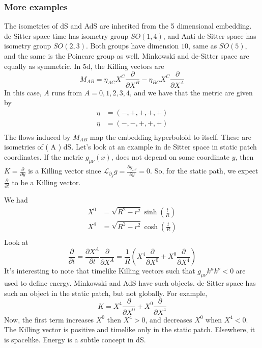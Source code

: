 \subsubsection{More examples} 
The isometries of dS and AdS are inherited from 
the 5 dimensional embedding. 
de-Sitter space time has isometry group $ SO ( 1, 4 ) $, 
and Anti de-Sitter space has isometry group $ SO ( 2, 3 ) $. 
Both groups have dimension  $ 10 $, same as 
$ SO ( 5 ) $, and the same is the Poincare group as well.
Minkowski and de-Sitter space are equally as symmetric.
In 5d, the Killing vectors are 
\[
 M_{ AB }  = \eta_{ AC } X ^ C \frac{\partial  }{\partial  X ^ B } - 
 \eta _{ B C} X ^ C \frac{\partial   }{\partial  X ^ A } 
\] In this case, $ A $ runs from $ A  = 0 , 1, 2, 3, 4$, 
and we have that the metric are given by 
 \begin{align*}
	 \eta &=  ( - , + , + , + , + )  \\
	 \eta &=  (- , -, + , + , + )  \\
 \end{align*} 
 The flows induced by $ M_{AB } $ map the embedding 
 hyperboloid to itself. These are isometries of 
 ( A ) dS. 
 Let's look at an example in de Sitter space in static patch coordinates. 
 If the metric $ g_{ \mu \nu } ( x) $, does not 
 depend on some coordinate $ y $, then $ K = \frac{\partial }{\partial y } $ 
 is a Killing vector since $ \mathcal{ L }_{ \partial  _ y } g   = 
 \frac{ \partial  g_{ \mu \nu } }{ \partial  y }  = 0 $. 
 So, for the static path, we expect $ \frac{\partial  }{\partial  t }  $ 
 to be a Killing vector.

 We had 
 \begin{align*}
	 X ^ 0 &=  \sqrt{ R ^ 2 - r ^ 2 }  \sinh \left(  \frac{t}{R} \right)  \\
	 X ^ 4 &=  \sqrt{ R ^ 2 - r ^ 2 }  \cosh \left(  \frac{t}{R} \right)  \\
 \end{align*}
 Look at 
 \[
  \frac{\partial  }{\partial  t }  =  \frac{\partial X ^ A  }{\partial t }  
  \frac{\partial  }{\partial  X ^ A }   = \frac{1}{R  } \left(  X ^ 4 \frac{\partial  }{\partial  X ^ 0 }
   + X ^ 0 \frac{\partial   }{\partial X ^ 4 } \right) 
 \]  It's interesting to note that 
 timelike Killing vectors such that $ g_{ \mu \nu  }  k ^ \mu k ^ \nu  < 0 $ 
 are used to define energy. Minkowski and AdS have such objects. 
 de-Sitter space has such an object in the static patch, 
 but not globally. 
For example, 
\[
 K = X ^ 4 \frac{\partial  }{\partial  X ^ 0 }  + X ^ 0 \frac{\partial  }{\partial  X ^ 4 } 
\] Now, the first term increases $ X ^ 0 $ then $ X ^ 4 > 0 $, 
and decreases $ X ^ 0 $ when $ X ^ 4 < 0 $. 
The Killing vector is positive and timelike only in the static patch. 
Elsewhere, it is spacelike. Energy is a subtle concept in dS.

